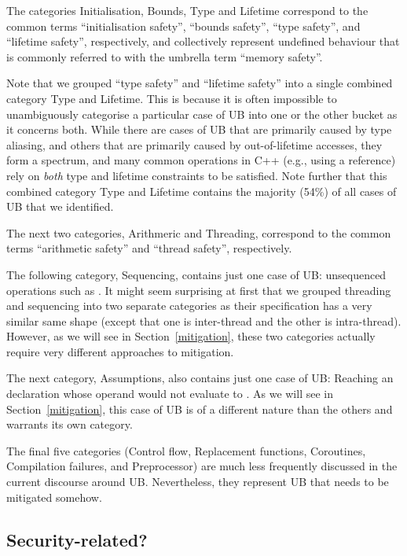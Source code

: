 The categories Initialisation, Bounds, Type and Lifetime correspond to the common terms  ``initialisation safety'',  ``bounds safety'', ``type safety'',  and ``lifetime safety'', respectively, and collectively represent undefined behaviour that is commonly referred to with the umbrella term ``memory safety''. 

Note that we grouped ``type safety'' and ``lifetime safety'' into a single combined category Type and Lifetime. This is because it is often impossible to unambiguously categorise a particular case of UB into one or the other bucket as it concerns both. While there are cases of UB that are primarily caused by type aliasing, and others that are primarily caused by out-of-lifetime accesses, they form a spectrum, and many common operations in C++ (e.g., using a reference) rely on \emph{both} type and lifetime constraints to be satisfied. Note further that this combined category Type and Lifetime contains the majority (54\%) of all cases of UB that we identified.

The next two categories, Arithmeric and Threading, correspond to the common terms ``arithmetic safety'' and ``thread safety'', respectively.

The following category, Sequencing, contains just one case of UB: unsequenced operations such as \mbox{}. It might seem surprising at first that we grouped threading and sequencing into two separate categories as their specification has a very similar same shape (except that one is inter-thread and the other is intra-thread). However, as we will see in Section~\ref{mitigation}, these two categories actually require very different approaches to mitigation.

The next category, Assumptions, also contains just one case of UB: Reaching an \tcode{[[assume]]} declaration whose operand would not evaluate to . As we will see in Section~\ref{mitigation}, this case of UB is of a different nature than the others and warrants its own category.

The final five categories (Control flow, Replacement functions, Coroutines, Compilation failures, and Preprocessor) are much less frequently discussed in the current discourse around UB. Nevertheless, they represent UB that needs to be mitigated somehow.

\subsection{Security-related?}

